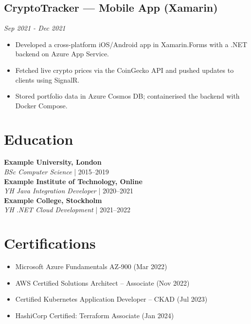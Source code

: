 \documentclass[a4paper,10pt]{article}
\begin{document}
\subsection*{CryptoTracker — Mobile App (Xamarin)}
\textit{Sep 2021 - Dec 2021}
\begin{itemize}[noitemsep]
\item Developed a cross-platform iOS/Android app in Xamarin.Forms with a .NET backend on Azure App Service.
\item Fetched live crypto prices via the CoinGecko API and pushed updates to clients using SignalR.
\item Stored portfolio data in Azure Cosmos DB; containerised the backend with Docker Compose.
\end{itemize}

\section*{Education}
\textbf{Example University, London}\\
\textit{BSc Computer Science} | 2015--2019\\
\textbf{Example Institute of Technology, Online}\\
\textit{YH Java Integration Developer} | 2020--2021\\
\textbf{Example College, Stockholm}\\
\textit{YH .NET Cloud Development} | 2021--2022\\

\section*{Certifications}
\begin{itemize}
    \item Microsoft Azure Fundamentals AZ-900 (Mar 2022)
    \item AWS Certified Solutions Architect -- Associate (Nov 2022)
    \item Certified Kubernetes Application Developer -- CKAD (Jul 2023)
    \item HashiCorp Certified: Terraform Associate (Jan 2024)
\end{itemize}
\end{document}
